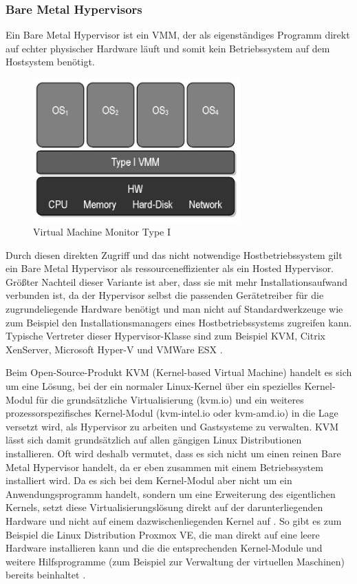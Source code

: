 \subsubsection{Bare Metal Hypervisors}

Ein Bare Metal Hypervisor ist ein \ac{VMM}, der als eigenständiges Programm direkt auf echter physischer Hardware läuft und somit kein Betriebssystem auf dem Hostsystem benötigt.

\begin{figure}[!ht]
  \begin{center}
    \includegraphics[width=8cm]{bilder/VMM-Type1.jpg}
    \caption{Virtual Machine Monitor Type I \citep{wiki:002}}
  \end{center}
\end{figure}

Durch diesen direkten Zugriff und das nicht notwendige Hostbetriebssystem gilt ein Bare Metal Hypervisor als ressourceneffizienter als ein Hosted Hypervisor. Größter Nachteil dieser Variante ist aber, dass sie mit mehr Installationsaufwand verbunden ist, da der Hypervisor selbst die passenden Gerätetreiber für die zugrundeliegende Hardware benötigt und man nicht auf Standardwerkzeuge wie zum Beispiel den Installationsmanagers eines Hostbetriebssystems zugreifen kann. Typische Vertreter dieser Hypervisor-Klasse sind zum Beispiel KVM, Citrix XenServer, Microsoft Hyper-V und VMWare ESX \citep{wiki:004}.

Beim Open-Source-Produkt KVM (Kernel-based Virtual Machine) handelt es sich um eine Lösung, bei der ein normaler Linux-Kernel über ein spezielles Kernel-Modul für die grundsätzliche Virtualisierung (kvm.io) und ein weiteres prozessorspezifisches Kernel-Modul (kvm-intel.io oder kvm-amd.io) in die Lage versetzt wird, als Hypervisor zu arbeiten und Gastsysteme zu verwalten. KVM lässt sich damit grundsätzlich auf allen gängigen Linux Distributionen installieren. Oft wird deshalb vermutet, dass es sich nicht um einen reinen Bare Metal Hypervisor handelt, da er eben zusammen mit einem Betriebssystem installiert wird. Da es sich bei dem Kernel-Modul aber nicht um ein Anwendungsprogramm handelt, sondern um eine Erweiterung des eigentlichen Kernels, setzt diese Virtualisierungslösung direkt auf der darunterliegenden Hardware und nicht auf einem dazwischenliegenden Kernel auf \citep[Vgl.][]{kvm:001}. So gibt es zum Beispiel die Linux Distribution Proxmox VE, die man direkt auf eine leere Hardware installieren kann und die die entsprechenden Kernel-Module und weitere Hilfsprogramme (zum Beispiel zur Verwaltung der virtuellen Maschinen) bereits beinhaltet \citep[Vgl.][]{Proxmox14}.

